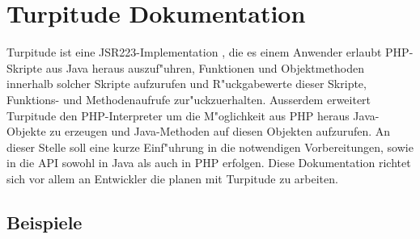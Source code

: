 \chapter{Turpitude Dokumentation}
\label{sec:app1}

Turpitude ist eine JSR223-Implementation \cite{JSRHP}, die es einem Anwender erlaubt PHP-Skripte
aus Java heraus auszuf"uhren, Funktionen und Objektmethoden innerhalb solcher Skripte aufzurufen
und R"uckgabewerte dieser Skripte, Funktions- und Methodenaufrufe zur"uckzuerhalten.
Ausserdem erweitert Turpitude den PHP-Interpreter um die M"oglichkeit aus PHP heraus
Java-Objekte zu erzeugen und Java-Methoden auf diesen Objekten aufzurufen.
An dieser Stelle soll eine kurze Einf"uhrung in die notwendigen Vorbereitungen, sowie
in die API sowohl in Java als auch in PHP erfolgen.
Diese Dokumentation richtet sich vor allem an Entwickler die planen mit Turpitude zu arbeiten.



\section{Beispiele}









